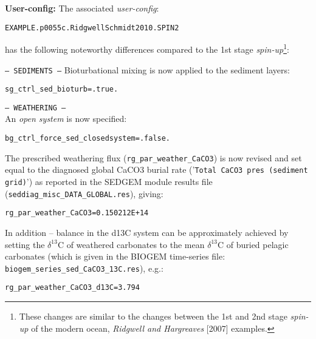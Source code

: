 \documentclass[10pt,twoside]{article}
\begin{document}
\noindent \textbf{User-config:} The associated \textit{user-config}:
\vspace{-10pt}\begin{verbatim}EXAMPLE.p0055c.RidgwellSchmidt2010.SPIN2\end{verbatim}\vspace{-10pt}
has the following noteworthy differences compared to the 1st stage \textit{spin-up}\footnote{These changes are similar to the changes between the 1st and 2nd stage \textit{spin-up} of the modern ocean, \textit{Ridgwell and Hargreaves} [2007] examples.}:

\begin{compactitem}
                \item \texttt{--- SEDIMENTS ---}
Bioturbational mixing is now applied to the sediment layers:
                \vspace{-5pt}\begin{verbatim}
sg_ctrl_sed_bioturb=.true.
                \end{verbatim}\vspace{-5pt}
                \item \texttt{--- WEATHERING ---}
                \\ An \textit{open  system} is now specified:
\vspace{-5pt}\begin{verbatim}
bg_ctrl_force_sed_closedsystem=.false.
                \end{verbatim}\vspace{-5pt}
The prescribed weathering flux (\texttt{rg\_par\_weather\_CaCO3}) is now revised and set equal to the diagnosed global CaCO3 burial rate ('\texttt{Total CaCO3 pres (sediment grid)}') as reported in the SEDGEM module results file (\texttt{seddiag\_misc\_DATA\_GLOBAL.res}), giving:
\vspace{-5pt}\begin{verbatim}
rg_par_weather_CaCO3=0.150212E+14
                \end{verbatim}\vspace{-5pt}
                In addition -- balance in the d13C system can be approximately achieved by setting the $\delta^{13}$C of weathered carbonates to the mean $\delta^{13}$C of buried pelagic carbonates (which is given in the BIOGEM time-series file: \texttt{biogem\_series\_sed\_CaCO3\_13C.res}), e.g.:
                \vspace{-5pt}\begin{verbatim}
rg_par_weather_CaCO3_d13C=3.794
                \end{verbatim}\vspace{-5pt}
        \end{compactitem}
\end{document}
